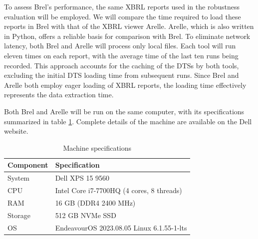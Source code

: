 To assess Brel's performance, the same XBRL reports used in the robustness evaluation will be employed.
We will compare the time required to load these reports in Brel
with that of the XBRL viewer Arelle\cite{arelle}.
Arelle, which is also written in Python,
offers a reliable basis for comparison with Brel.
To eliminate network latency, both Brel and Arelle will process only local files.
Each tool will run eleven times on each report, with the average time of the last ten runs being recorded.
This approach accounts for the caching of the DTSs by both tools,
excluding the initial DTS loading time from subsequent runs.
Since Brel and Arelle both employ eager loading of XBRL reports,
the loading time effectively represents the data extraction time.

Both Brel and Arelle will be run on the same computer,
with its specifications summarized in table \ref{tab:machine-specs}.
Complete details of the machine are available on the Dell website\cite{dell_xps_9560_specs}.

\begin{table}[H]
    \centering
    \begin{tabular}{|l|l|}
        \hline
        \textbf{Component} & \textbf{Specification} \\
        \hline
        System & Dell XPS 15 9560 \\
        CPU & Intel Core i7-7700HQ (4 cores, 8 threads) \\
        RAM & 16 GB (DDR4 2400 MHz) \\
        Storage & 512 GB NVMe SSD \\
        OS & EndeavourOS 2023.08.05 Linux 6.1.55-1-lts \\
        \hline
    \end{tabular}
    \caption{Machine specifications\cite{dell_xps_9560_specs}}
    \label{tab:machine-specs}
\end{table}



